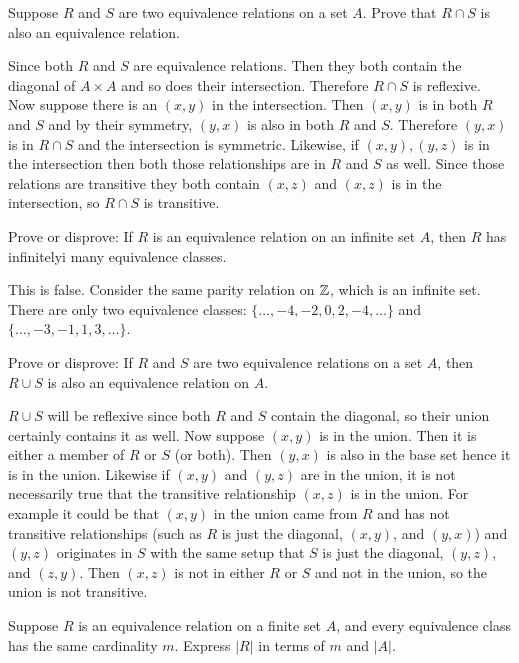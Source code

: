 \documentclass{article}
\begin{document}
\begin{problem}
Suppose $R$ and $S$ are two equivalence relations on a set $A$. Prove that $R \cap S$ is also an equivalence relation.
\end{problem}

Since both $R$ and $S$ are equivalence relations. Then they both contain the diagonal of $A \times A$ and so does their intersection. Therefore $R \cap S$ is reflexive. Now suppose there is an $(x, y)$ in the intersection. Then $(x, y)$ is in both $R$ and $S$ and by their symmetry, $(y, x)$ is also in both $R$ and $S$. Therefore $(y, x)$ is in $R \cap S$ and the intersection is symmetric. Likewise, if $(x, y), (y, z)$ is in the intersection then both those relationships are in $R$ and $S$ as well. Since those relations are transitive they both contain $(x, z)$ and $(x, z)$ is in the intersection, so $R \cap S$ is transitive.

\begin{problem}
Prove or disprove: If $R$ is an equivalence relation on an infinite set $A$, then $R$ has infinitelyi many equivalence classes.
\end{problem}

This is false. Consider the same parity relation on $\mathbb{Z}$, which is an infinite set. There are only two equivalence classes: $\{\ldots, -4, -2, 0, 2, -4, \ldots \}$ and $\{\ldots, -3, -1, 1, 3, \ldots\}$.

\begin{problem}
Prove or disprove: If $R$ and $S$ are two equivalence relations on a set $A$, then $R \cup S$ is also an equivalence relation on $A$.
\end{problem}

$R \cup S$ will be reflexive since both $R$ and $S$ contain the diagonal, so their union certainly contains it as well. Now suppose $(x, y)$ is in the union. Then it is either a member of $R$ or $S$ (or both). Then $(y, x)$ is also in the base set hence it is in the union. Likewise if $(x, y)$ and $(y, z)$ are in the union, it is not necessarily true that the transitive relationship $(x, z)$ is in the union. For example it could be that $(x, y)$ in the union came from $R$ and has not transitive relationships (such as $R$ is just the diagonal, $(x, y)$, and $(y, x)$) and $(y, z)$ originates in $S$ with the same setup that $S$ is just the diagonal, $(y, z)$, and $(z, y)$. Then $(x, z)$ is not in either $R$ or $S$ and not in the union, so the union is not transitive.

\begin{problem}
Suppose $R$ is an equivalence relation on a finite set $A$, and every equivalence class has the same cardinality $m$. Express $|R|$ in terms of $m$ and $|A|$.
\end{problem}
\end{document}

